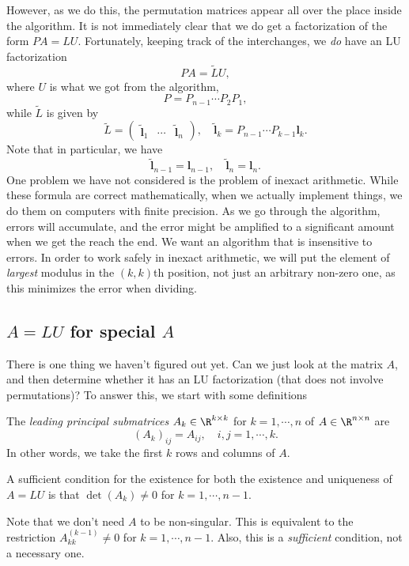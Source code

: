\documentclass[a4paper]{article}
\begin{document}
However, as we do this, the permutation matrices appear all over the place inside the algorithm. It is not immediately clear that we do get a factorization of the form $PA = LU$. Fortunately, keeping track of the interchanges, we \emph{do} have an LU factorization
\[
  PA = \tilde{L}U,
\]
where $U$ is what we got from the algorithm,
\[
  P = P_{n - 1} \cdots P_2 P_1,
\]
while $\tilde{L}$ is given by
\[
  \tilde{L} =
  \begin{pmatrix}
    \tilde{\mathbf{l}}_1 & \cdots & \tilde{\mathbf{l}}_n
  \end{pmatrix},
  \quad \tilde{\mathbf{l}}_k = P_{n - 1} \cdots P_{k - 1} \mathbf{l}_k.
\]
Note that in particular, we have
\[
  \tilde{\mathbf{l}}_{n - 1} = \mathbf{l}_{n - 1},\quad \tilde{\mathbf{l}}_n = \mathbf{l}_n.
\]
One problem we have not considered is the problem of inexact arithmetic. While these formula are correct mathematically, when we actually implement things, we do them on computers with finite precision. As we go through the algorithm, errors will accumulate, and the error might be amplified to a significant amount when we get the reach the end. We want an algorithm that is insensitive to errors. In order to work safely in inexact arithmetic, we will put the element of \emph{largest} modulus in the $(k, k)$th position, not just an arbitrary non-zero one, as this minimizes the error when dividing.

\subsection{\texorpdfstring{$A = LU$}{A = LU} for special \texorpdfstring{$A$}{A}}
There is one thing we haven't figured out yet. Can we just look at the matrix $A$, and then determine whether it has an LU factorization (that does not involve permutations)? To answer this, we start with some definitions

\begin{defi}
  The \emph{leading principal submatrices} $A_k \in \R^{k \times k}$ for $k = 1, \cdots, n$ of $A \in \R^{n \times n}$ are
  \[
    (A_k)_{ij} = A_{ij},\quad i, j = 1, \cdots, k.
  \]
  In other words, we take the first $k$ rows and columns of $A$.
\end{defi}

\begin{thm}
  A sufficient condition for the existence for both the existence and uniqueness of $A = LU$ is that $\det(A_{k}) \not= 0$ for $k = 1, \cdots, n - 1$.
\end{thm}
Note that we don't need $A$ to be non-singular. This is equivalent to the restriction $A_{kk}^{(k - 1)} \not= 0$ for $k = 1, \cdots, n - 1$. Also, this is a \emph{sufficient} condition, not a necessary one.
\end{document}
